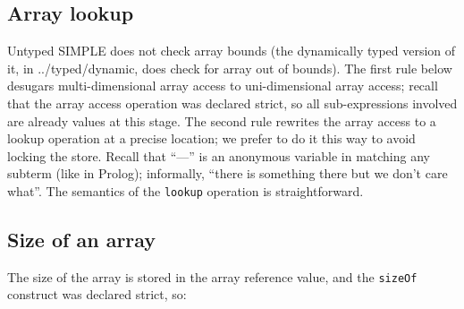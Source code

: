 \documentclass{article}
\begin{document}
\begin{kdefinition}
\begin{module}{}
\begin{kblock}[text]
 \subsection{Array lookup}
Untyped SIMPLE does not check array bounds (the dynamically typed version of
it, in ../typed/dynamic, does check for array out of bounds).  The first rule
below desugars multi-dimensional array access to uni-dimensional array access;
recall that the array access operation was declared strict, so all
sub-expressions involved are already values at this stage.  The second rule
rewrites the array access to a lookup operation at a precise location; we
prefer to do it this way to avoid locking the store.  Recall that ``---'' is an
anonymous variable in \K matching any subterm (like in Prolog); informally,
``there is something there but we don't care what''.
The semantics of the \texttt{lookup} operation is straightforward. \end{kblock}

\begin{syntaxBlock}{}
\end{syntaxBlock}
\begin{kblock}[text]
 \subsection{Size of an array}
The size of the array is stored in the array reference value, and the
\texttt{sizeOf} construct was declared strict, so: \end{kblock}
\begin{kblock}[text]

\end{kblock}
\end{module}
\end{kdefinition}
\end{document}

